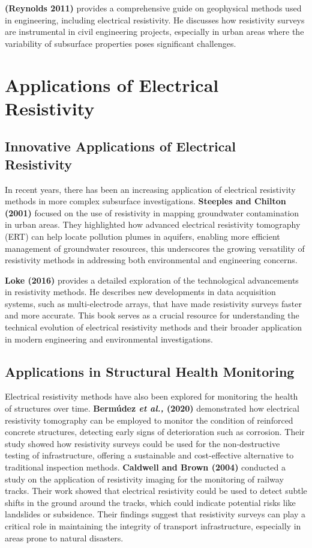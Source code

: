 \documentclass[12pt,a4paper]{report}
\begin{document}
\textbf{(Reynolds 2011)} provides a comprehensive guide on geophysical methods used in engineering, including electrical resistivity. He discusses how resistivity surveys are instrumental in civil engineering projects, especially in urban areas where the variability of subsurface properties poses significant challenges.
\section{Applications of Electrical Resistivity}

\subsection{Innovative Applications of Electrical Resistivity}
In recent years, there has been an increasing application of electrical resistivity methods in more complex subsurface investigations. \textbf{Steeples and Chilton (2001)} focused on the use of resistivity in mapping groundwater contamination in urban areas. They highlighted how advanced electrical resistivity tomography (ERT) can help locate pollution plumes in aquifers, enabling more efficient management of groundwater resources, this underscores the growing versatility of resistivity methods in addressing both environmental and engineering concerns.

\textbf{Loke (2016)} provides a detailed exploration of the technological advancements in resistivity methods. He describes new developments in data acquisition systems, such as multi-electrode arrays, that have made resistivity surveys faster and more accurate. This book serves as a crucial resource for understanding the technical evolution of electrical resistivity methods and their broader application in modern engineering and environmental investigations.

\subsection{Applications in Structural Health Monitoring}
Electrical resistivity methods have also been explored for monitoring the health of structures over time. \textbf{Bermúdez \textit{et al.,} (2020)} demonstrated how electrical resistivity tomography can be employed to monitor the condition of reinforced concrete structures, detecting early signs of deterioration such as corrosion. Their study showed how resistivity surveys could be used for the non-destructive testing of infrastructure, offering a sustainable and cost-effective alternative to traditional inspection methods.
\textbf{Caldwell and Brown (2004)} conducted a study on the application of resistivity imaging for the monitoring of railway tracks. Their work showed that electrical resistivity could be used to detect subtle shifts in the ground around the tracks, which could indicate potential risks like landslides or subsidence. Their findings suggest that resistivity surveys can play a critical role in maintaining the integrity of transport infrastructure, especially in areas prone to natural disasters.
\end{document}
